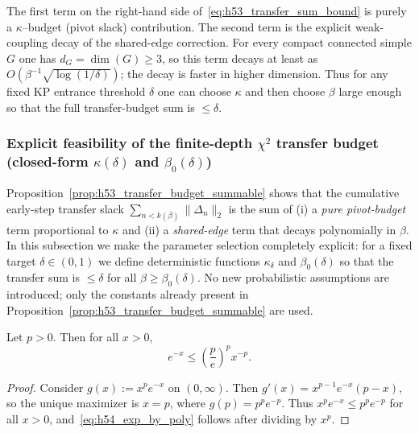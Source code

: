 \begin{remark}
The first term on the right-hand side of~\eqref{eq:h53_transfer_sum_bound} is purely a
$\kappa$--budget (pivot slack) contribution.
The second term is the explicit weak-coupling decay of the shared-edge correction.
For every compact connected simple $G$ one has $d_G=\dim(G)\ge 3$, so this term decays at least as $O(\beta^{-1}\sqrt{\log(1/\delta)})$; the decay is faster in higher dimension.
Thus for any fixed KP entrance threshold $\delta$ one can choose $\kappa$ and then choose
$\beta$ large enough so that the full transfer-budget sum is $\le \delta$.
\end{remark}


\subsubsection{Explicit feasibility of the finite-depth \texorpdfstring{$\chi^2$}{chi2} transfer budget (closed-form \texorpdfstring{$\kappa(\delta)$}{kappa(delta)} and \texorpdfstring{$\beta_0(\delta)$}{beta\_0(delta)})}
\label{sec:transfer_budget_feasibility}

Proposition~\ref{prop:h53_transfer_budget_summable} shows that the cumulative early-step transfer slack
$\sum_{n<k(\beta)}\|\Delta_n\|_2$ is the sum of (i) a \emph{pure pivot-budget} term proportional to $\kappa$ and
(ii) a \emph{shared-edge} term that decays polynomially in $\beta$.
In this subsection we make the parameter selection completely explicit:
for a fixed target $\delta\in(0,1)$ we define deterministic functions $\kappa_{\delta}$ and $\beta_0(\delta)$
so that the transfer sum is $\le \delta$ for all $\beta\ge \beta_0(\delta)$.
No new probabilistic assumptions are introduced; only the constants already present in Proposition~\ref{prop:h53_transfer_budget_summable} are used.

\begin{lemma}
\label{lem:h54_exp_by_poly}
Let $p>0$. Then for all $x>0$,
\begin{equation}
\label{eq:h54_exp_by_poly}
 e^{-x} \le \left(\frac{p}{e}\right)^p x^{-p}.
\end{equation}
\end{lemma}

\begin{proof}
Consider $g(x):=x^p e^{-x}$ on $(0,\infty)$. Then
$g'(x)=x^{p-1}e^{-x}(p-x)$, so the unique maximizer is $x=p$, where $g(p)=p^p e^{-p}$.
Thus $x^p e^{-x}\le p^p e^{-p}$ for all $x>0$, and~\eqref{eq:h54_exp_by_poly} follows after dividing by $x^p$.
\end{proof}

